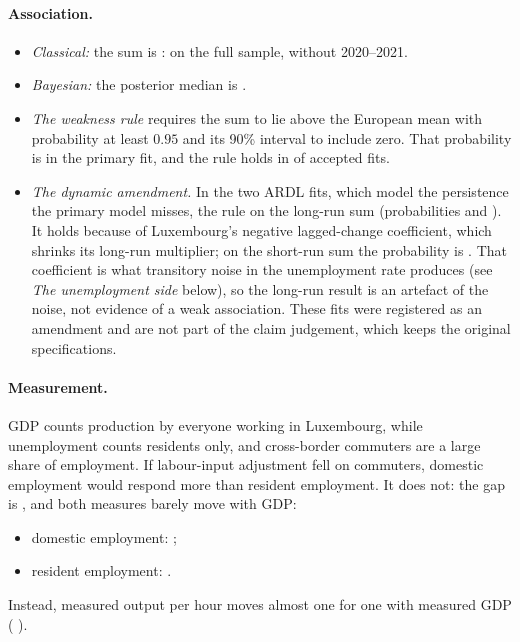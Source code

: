 \paragraph{Association.}
\begin{itemize}
  \item \emph{Classical:} the sum is :  on the full
    sample,  without 2020--2021.
  \item \emph{Bayesian:} the posterior median is  .
  \item \emph{The weakness rule} requires the sum to lie above the European mean with
    probability at least $0.95$ and its 90\% interval to include zero. That probability is
     in the primary fit, and the rule holds in  of
     accepted fits.
  \item \emph{The dynamic amendment.} In the two ARDL fits, which model the persistence
    the primary model misses, the rule  on the long-run sum
    (probabilities  and ). It holds because of
    Luxembourg's negative lagged-change coefficient, which shrinks its long-run multiplier;
    on the short-run sum the probability is . That coefficient is
    what transitory noise in the unemployment rate produces (see \emph{The unemployment
    side} below), so the long-run result is an artefact of the noise, not evidence of a
    weak association. These fits were registered as an amendment and are not part of the
    claim judgement, which keeps the original  specifications.
\end{itemize}

\paragraph{Measurement.} GDP counts production by everyone working in Luxembourg, while
unemployment counts residents only, and cross-border commuters are a large share of
employment. If labour-input adjustment fell on commuters, domestic employment would respond
more than resident employment. It does not: the gap is  , and
both measures barely move with GDP:
\begin{itemize}
  \item domestic employment:  ;
  \item resident employment:  .
\end{itemize}
Instead, measured output per hour moves almost one for one with measured GDP
( ).

